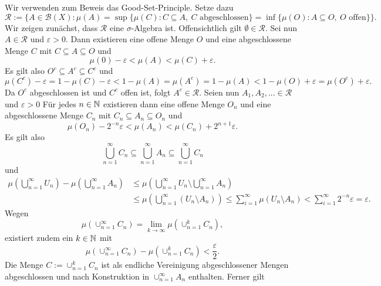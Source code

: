 \begin{proof*}
    Wir verwenden zum Beweis das Good-Set-Principle. Setze dazu
    $$
        \mathcal{R}:=\big\{A \in \mathcal{B}(X):  \mu(A) = \sup\{\mu(C): C \subseteq A, \ C \text{ abgeschlossen}\} =\inf\{\mu(O): A \subseteq O, \ O \text{ offen}\} \big\}.
    $$
    Wir zeigen zunächst, dass $\mathcal{R}$ eine $\sigma$-Algebra ist. Offensichtlich gilt $\emptyset \in \mathcal{R}$. Sei nun $A \in \mathcal{R}$ und $\varepsilon > 0$. 
    Dann existieren eine offene Menge $O$ und eine abgeschlossene Menge $C$ mit $C \subseteq A \subseteq O$ und 
    $$
        \mu(0) - \varepsilon < \mu(A) < \mu(C) + \varepsilon.
    $$
    Es gilt also $O^c \subseteq A^c \subseteq C^c$ und 
    $$
        \mu(C^c) - \varepsilon = 1 - \mu(C) - \varepsilon < 1 - \mu(A) = \mu(A^c) = 1 - \mu(A) < 1 - \mu(O) + \varepsilon = \mu(O^c) + \varepsilon. 
    $$
    Da $O^c$ abgeschlossen ist und $C^c$ offen ist, folgt $A^c \in \mathcal{R}$. 
    \newline 
    Seien nun $A_1, A_2,... \in \mathcal{R}$ und $\varepsilon > 0$ Für jedes $n \in \mathbb{N}$ existieren dann eine offene Menge $O_n$ und eine abgeschlossene Menge $C_n$ mit $C_n \subseteq A_n \subseteq O_n$ und 
    $$
        \mu(O_n) - 2^{-n}\varepsilon < \mu(A_n) < \mu(C_n) + 2^{n+1}\varepsilon.
    $$
    Es gilt also
    $$
        \bigcup_{n = 1}^{\infty} C_n \subseteq \bigcup_{n=1}^{\infty} A_n \subseteq \bigcup_{n=1}^{\infty}C_n
    $$
    und 
    \begin{align}
        \mu\left(\bigcup_{n =1}^{\infty}U_n\right) - \mu\left(\bigcup_{n=1}^{\infty}A_n\right) &\leq \mu\left(\bigcup_{n =1}^{\infty}U_n\setminus \bigcup_{n =1}^{\infty} A_n\right) \nonumber \\\
                                                                                &\leq \mu\left(\bigcup_{n =1}^{\infty}(U_n\setminus A_n)\right) 
                                                                                \leq \sum_{i=1}^{\infty}\mu(U_n\setminus A_n)
                                                                                < \sum_{i=1}^{\infty}2^{-n}\varepsilon = \varepsilon. 
    \end{align}
    Wegen 
    $$
    \mu(\cup_{n = 1}^{\infty}C_n) = \lim_{k \to \infty}\mu(\cup_{n=1}^kC_n),
    $$
    existiert zudem ein $k \in \mathbb{N}$ mit 
    $$
    \mu(\cup_{n=1}^{\infty}C_n) - \mu(\cup_{n=1}^kC_n) < \frac{\varepsilon}{2}.
    $$ 
    Die Menge $C:= \cup_{n=1}^kC_n$ ist als endliche Vereinigung abgeschlossener Mengen abgeschlossen und nach Konstruktion in $\cup_{n=1}^{\infty}A_n$ enthalten. Ferner gilt 

\end{proof*}
